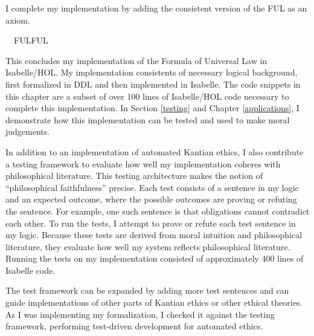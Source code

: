 \begin{isabellebody}
\begin{isamarkuptext}
I complete my implementation by adding the consistent version of the FUL as an axiom.%
\end{isamarkuptext}\isamarkuptrue%
\isamarkupfalse%
\ \ FUL{\isacharcolon}FUL%
\begin{isamarkuptext}%
This concludes my implementation of the Formula of Universal Law in Isabelle/HOL. My implementation
consistents of necessary logical background, first formalized in DDL and then implemented in Isabelle.
The code snippets in this chapter are a subset of over 100 lines of Isabelle/HOL code necessary to
complete this implementation. In Section \ref{testing} and Chapter \ref{applications}, I demonstrate how this
implementation can be tested and used to make moral judgements.%
\end{isamarkuptext}\isamarkuptrue%
%
\isadelimdocument
%
\endisadelimdocument
%
\isatagdocument
%
\isamarkuptrue%
%
\endisatagdocument
{\isafolddocument}%
%
\isadelimdocument
%
\endisadelimdocument
%
\begin{isamarkuptext}%
In addition to an implementation of automated Kantian ethics, I also contribute a testing framework 
to evaluate how well my implementation coheres with philosophical literature. This testing architecture 
makes the notion of ``philosophical faithfulness'' precise. Each test consists of a sentence in my logic 
and an expected outcome, where the possible outcomes are proving or refuting the sentence. For example, 
one such sentence is that obligations cannot contradict each other. To run the tests, I attempt to
 prove or refute each test sentence in my logic.  Because these tests are derived from moral 
intuition and philosophical literature, they evaluate how well my system reflects philosophical
literature. Running the tests on my implementation consisted of approximately 400 lines of Isabelle code.

The test framework can be expanded by adding more test sentences and can guide 
implementations of other parts of Kantian ethics or other ethical theories. As I was implementing my 
formalization, I checked it against the testing framework, performing test-driven development for automated 
ethics.


\end{isamarkuptext}
\end{isabellebody}
